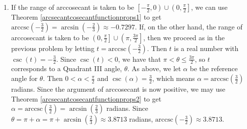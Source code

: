 \documentclass[12pt]{ximera}
\begin{document}
\begin{example}
\begin{enumerate}
\begin{enumerate}
\begin{tabular}{m{2.5in}m{1in}m{2.5in}}
& 

&

 \\ 

\end{tabular}



\item If the range of arccosecant is taken to be $\left[-\frac{\pi}{2}, 0\right) \cup \left(0, \frac{\pi}{2}\right]$, we can use Theorem \ref{arcsecantcosecantfunctionprops1} to get $\mbox{arccsc}\left(-\frac{3}{2}\right) = \arcsin\left(-\frac{2}{3}\right) \approx -0.7297$.  If, on the other hand, the range of arccosecant is taken to be $\left(0, \frac{\pi}{2}\right] \cup \left(\pi, \frac{3\pi}{2}\right]$, then we proceed as in the previous problem by  letting $t = \mbox{arccsc}\left(-\frac{3}{2}\right)$.  Then $t$ is a real number with $\csc(t) = -\frac{3}{2}$.  Since $\csc(t) < 0$, we have that $\pi < \theta \leq \frac{3\pi}{2}$, so $t$ corresponds to a Quadrant III angle, $\theta$.  As above, we let $\alpha$ be the reference angle for $\theta$.  Then $0 < \alpha < \frac{\pi}{2}$ and $\csc(\alpha) =\frac{3}{2}$, which means $\alpha = \mbox{arccsc}\left(\frac{3}{2}\right)$ radians.  Since the argument of arccosecant is now positive, we may use Theorem \ref{arcsecantcosecantfunctionprops2}  to get $\alpha = \mbox{arccsc}\left(\frac{3}{2}\right) = \arcsin\left(\frac{2}{3}\right)$ radians.  Since $\theta = \pi + \alpha = \pi +  \arcsin\left(\frac{2}{3}\right) \approx 3.8713$ radians,  $\mbox{arccsc}\left(-\frac{3}{2}\right) \approx 3.8713$.

\begin{tabular}{m{2.5in}m{1in}m{2.5in}}




\end{tabular}
\end{enumerate}
\end{enumerate}
\end{example}
\end{document}
